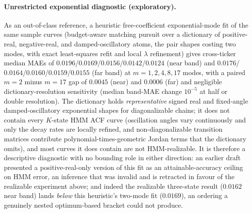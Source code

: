 \paragraph{Unrestricted exponential diagnostic (exploratory).}
As an out-of-class reference, a heuristic free-coefficient exponential-mode fit of the same sample curves (budget-aware matching pursuit over a dictionary of positive-real, negative-real, and damped-oscillatory atoms, the pair shapes costing two modes, with exact least-squares refit and local $\lambda$ refinement) gives cross-ticker median MAEs of $0.0196$/$0.0169$/$0.0156$/$0.0142$/$0.0124$ (near band) and $0.0176$/$0.0164$/$0.0160$/$0.0159$/$0.0155$ (far band) at $m = 1, 2, 4, 8, 17$ modes, with a paired $m = 2$ minus $m = 17$ gap of $0.0045$ (near) and $0.0006$ (far) and negligible dictionary-resolution sensitivity (median band-MAE change $10^{-5}$ at half or double resolution). The dictionary holds \emph{representative} signed real and fixed-angle damped-oscillatory exponential shapes for diagonalizable chains; it does not contain every $K$-state HMM ACF curve (oscillation angles vary continuously and only the decay rates are locally refined, and non-diagonalizable transition matrices contribute polynomial-times-geometric Jordan terms that the dictionary omits), and most curves it does contain are not HMM-realizable. It is therefore a descriptive diagnostic with no bounding role in either direction: an earlier draft presented a positive-real-only version of this fit as an attainable-accuracy ceiling on HMM error, an inference that was invalid and is retracted in favour of the realizable experiment above; and indeed the realizable three-state result ($0.0162$ near band) lands \emph{below} this heuristic's two-mode fit ($0.0169$), an ordering a genuinely nested optimum-based bracket could not produce.


